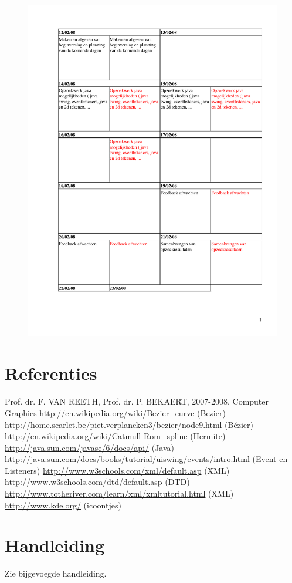 \documentclass[a4paper,11pt,oneside, titlepage]{article}
\begin{document}
\begin{figure}[htbp]
\centering
\includegraphics[scale=0.8, page=9]{./planning.pdf}
\end{figure}\newpage
\section{Referenties}
Prof. dr. F. VAN REETH, Prof. dr. P. BEKAERT, 2007-2008, Computer Graphics\newline
\url{http://en.wikipedia.org/wiki/Bezier\_curve} (Bezier)\newline
\url{http://home.scarlet.be/piet.verplancken3/bezier/node9.html} (B\'ezier)\newline
\url{http://en.wikipedia.org/wiki/Catmull-Rom\_spline} (Hermite)\newline
\url{http://java.sun.com/javase/6/docs/api/} (Java)\newline
\url{http://java.sun.com/docs/books/tutorial/uiswing/events/intro.html} (Event en Listeners)\newline
\url{http://www.w3schools.com/xml/default.asp} (XML)\newline
\url{http://www.w3schools.com/dtd/default.asp} (DTD)\newline
\url{http://www.totheriver.com/learn/xml/xmltutorial.html} (XML)\newline
\url{http://www.kde.org/} (icoontjes)\newline
\section{Handleiding}
Zie bijgevoegde handleiding.
\end{document}
